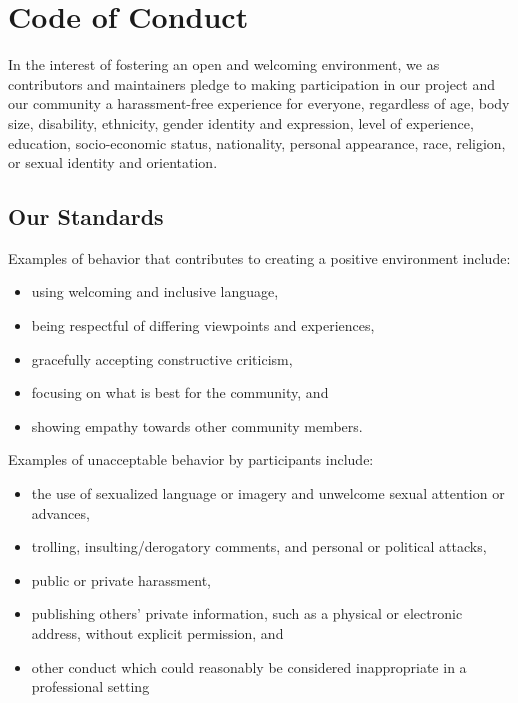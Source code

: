 \chapter{Code of Conduct}\label{s:conduct}

In the interest of fostering an open and welcoming environment, we as
contributors and maintainers pledge to making participation in our
project and our community a harassment-free experience for everyone,
regardless of age, body size, disability, ethnicity, gender identity
and expression, level of experience, education, socio-economic status,
nationality, personal appearance, race, religion, or sexual identity
and orientation.

\section{Our Standards}\label{s:conduct-standards}

Examples of behavior that contributes to creating a positive
environment include:

\begin{itemize}
\item
  using welcoming and inclusive language,
\item
  being respectful of differing viewpoints and experiences,
\item
  gracefully accepting constructive criticism,
\item
  focusing on what is best for the community, and
\item
  showing empathy towards other community members.
\end{itemize}

Examples of unacceptable behavior by participants include:

\begin{itemize}
\item
  the use of sexualized language or imagery and unwelcome sexual
  attention or advances,
\item
  trolling, insulting/derogatory comments, and personal or political
  attacks,
\item
  public or private harassment,
\item
  publishing others' private information, such as a physical or
  electronic address, without explicit permission, and
\item
  other conduct which could reasonably be considered inappropriate in
  a professional setting
\end{itemize}

